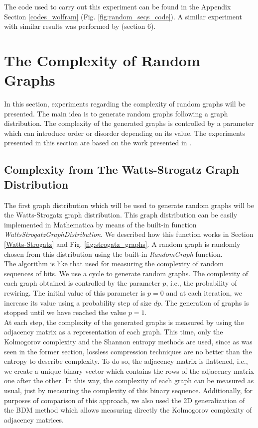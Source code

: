 The code used to carry out this experiment can be found in the Appendix Section \ref{codes_wolfram} (Fig. \ref{fig:random_seqs_code}). A similar experiment with similar results was performed by \cite{decomposition} (section 6).

\section{The Complexity of Random Graphs}
\label{comp_graphs_section}
In this section, experiments regarding the complexity of random graphs will be presented. The main idea is to generate random graphs following a graph distribution. The complexity of the generated graphs is controlled by a parameter which can introduce order or disorder depending on its value. The experiments presented in this section are based on the work presented in \cite{kolmo_graph}.

\subsection{Complexity from The Watts-Strogatz Graph Distribution}
\label{Watts-Strogatz_section}
The first graph distribution which will be used to generate random graphs will be the Watts-Strogatz graph distribution. This graph distribution can be easily implemented in Mathematica by means of the built-in function \textit{WattsStrogatzGraphDistribution}. We described how this function works in Section \ref{Watts-Strogatz} and Fig. \ref{fig:strogatz_graphs}. A random graph is randomly chosen from this distribution using the built-in \textit{RandomGraph} function.\\

The algorithm is like that used for measuring the complexity of random sequences of bits. We use a cycle to generate random graphs. The complexity of each graph obtained is controlled by the parameter $p$, i.e., the probability of rewiring. The initial value of this parameter is $p=0$ and at each iteration, we increase its value using a probability step of size $dp$. The generation of graphs is stopped until we have reached the value $p=1$.\\

At each step, the complexity of the generated graphs is measured by using the adjacency matrix as a representation of each graph. This time, only the Kolmogorov complexity and the Shannon entropy methods are used, since as was seen in the former section, lossless compression techniques are no better than the entropy to describe complexity.  To do so, the adjacency matrix is flattened, i.e., we create a unique binary vector which contains the rows of the adjacency matrix one after the other. In this way, the complexity of each graph can be measured as usual, just by measuring the complexity of this binary sequence. Additionally, for purposes of comparison of this approach, we also used the 2D generalization of the BDM method which allows measuring directly the Kolmogorov complexity of adjacency matrices.\\

